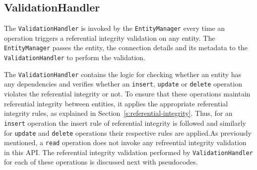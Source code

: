 		\subsection{ValidationHandler}\label{ss:VH}
		The \texttt{ValidationHandler} is invoked by the \texttt{EntityManager} every time
		an operation triggers a
		referential integrity validation on any entity. 
		The \texttt{EntityManager} passes the entity,  the connection details and its
		metadata to the \texttt{ValidationHandler} to perform the validation.  
		
		The \texttt{ValidationHandler} contains the logic for checking whether an entity
		has any dependencies and verifies whether an \texttt{insert}, \texttt{update} or
		\texttt{delete} operation  violates the referential integrity or not.
		To ensure that these operations maintain referential integrity between entities,
		it applies the appropriate referential integrity rules, as explained in
		Section~\ref{s:referential-integrity}. Thus, for an \texttt{insert} operation
		the insert rule of referential integrity is followed and similarly for
		\texttt{update} and \texttt{delete} operations their respective rules are
		applied.As previously mentioned, a \texttt{read} operation does not invoke any
		refreential integrity validation in this \ac{API}. The referential
		integrity validation performed by \texttt{ValidationHandler} for each of these
		operations is discussed next with pseudocodes.
		
